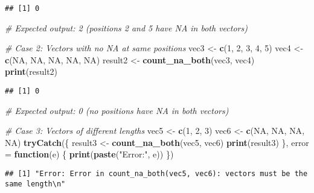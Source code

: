 \documentclass[
]{article}
\newenvironment{Shaded}{\begin{snugshade}}{\end{snugshade}}
\newcommand{\AttributeTok}[1]{\textcolor[rgb]{0.13,0.29,0.53}{#1}}
\newcommand{\CommentTok}[1]{\textcolor[rgb]{0.56,0.35,0.01}{\textit{#1}}}
\newcommand{\ConstantTok}[1]{\textcolor[rgb]{0.56,0.35,0.01}{#1}}
\newcommand{\ControlFlowTok}[1]{\textcolor[rgb]{0.13,0.29,0.53}{\textbf{#1}}}
\newcommand{\DecValTok}[1]{\textcolor[rgb]{0.00,0.00,0.81}{#1}}
\newcommand{\FunctionTok}[1]{\textcolor[rgb]{0.13,0.29,0.53}{\textbf{#1}}}
\newcommand{\NormalTok}[1]{#1}
\newcommand{\OtherTok}[1]{\textcolor[rgb]{0.56,0.35,0.01}{#1}}
\newcommand{\StringTok}[1]{\textcolor[rgb]{0.31,0.60,0.02}{#1}}
\begin{document}
\begin{verbatim}
## [1] 0
\end{verbatim}

\begin{Shaded}
\begin{Highlighting}[]
\CommentTok{\# Expected output: 2 (positions 2 and 5 have NA in both vectors)}

\CommentTok{\# Case 2: Vectors with no NA at same positions}
\NormalTok{vec3 }\OtherTok{\textless{}{-}} \FunctionTok{c}\NormalTok{(}\DecValTok{1}\NormalTok{, }\DecValTok{2}\NormalTok{, }\DecValTok{3}\NormalTok{, }\DecValTok{4}\NormalTok{, }\DecValTok{5}\NormalTok{)}
\NormalTok{vec4 }\OtherTok{\textless{}{-}} \FunctionTok{c}\NormalTok{(}\ConstantTok{NA}\NormalTok{, }\ConstantTok{NA}\NormalTok{, }\ConstantTok{NA}\NormalTok{, }\ConstantTok{NA}\NormalTok{, }\ConstantTok{NA}\NormalTok{)}
\NormalTok{result2 }\OtherTok{\textless{}{-}} \FunctionTok{count\_na\_both}\NormalTok{(vec3, vec4)}
\FunctionTok{print}\NormalTok{(result2)}
\end{Highlighting}
\end{Shaded}

\begin{verbatim}
## [1] 0
\end{verbatim}

\begin{Shaded}
\begin{Highlighting}[]
\CommentTok{\# Expected output: 0 (no positions have NA in both vectors)}

\CommentTok{\# Case 3: Vectors of different lengths}
\NormalTok{vec5 }\OtherTok{\textless{}{-}} \FunctionTok{c}\NormalTok{(}\DecValTok{1}\NormalTok{, }\DecValTok{2}\NormalTok{, }\DecValTok{3}\NormalTok{)}
\NormalTok{vec6 }\OtherTok{\textless{}{-}} \FunctionTok{c}\NormalTok{(}\ConstantTok{NA}\NormalTok{, }\ConstantTok{NA}\NormalTok{, }\ConstantTok{NA}\NormalTok{, }\ConstantTok{NA}\NormalTok{)}
\FunctionTok{tryCatch}\NormalTok{(\{}
\NormalTok{  result3 }\OtherTok{\textless{}{-}} \FunctionTok{count\_na\_both}\NormalTok{(vec5, vec6)}
  \FunctionTok{print}\NormalTok{(result3)}
\NormalTok{\}, }\AttributeTok{error =} \ControlFlowTok{function}\NormalTok{(e) \{}
  \FunctionTok{print}\NormalTok{(}\FunctionTok{paste}\NormalTok{(}\StringTok{"Error:"}\NormalTok{, e))}
\NormalTok{\})}
\end{Highlighting}
\end{Shaded}

\begin{verbatim}
## [1] "Error: Error in count_na_both(vec5, vec6): vectors must be the same length\n"
\end{verbatim}
\end{document}
